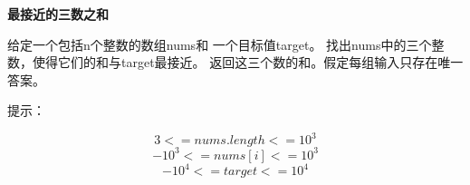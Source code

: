 \textbf{最接近的三数之和}\par

给定一个包括n个整数的数组nums和 一个目标值target。
找出nums中的三个整数，使得它们的和与target最接近。
返回这三个数的和。假定每组输入只存在唯一答案。\par

提示：\par

$$ 3 <= nums.length <= 10^{3} $$
$$ -10^{3} <= nums[i] <= 10^{3} $$
$$ -10^{4} <= target <= 10^{4} $$
